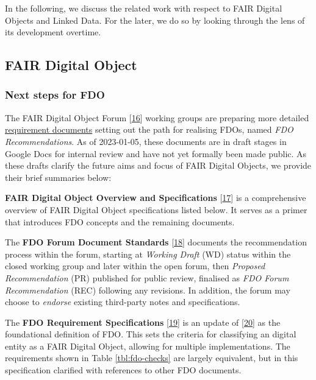 In the following, we discuss the related work with respect to FAIR Digital Objects and Linked Data. For the later, we do so by looking through the lens of its development overtime.

\hypertarget{sec:fdo}{%
\subsection{FAIR Digital Object}\label{sec:fdo}}

\hypertarget{sec:next-step-fdo}{%
\subsubsection{Next steps for FDO}\label{sec:next-step-fdo}}

The FAIR Digital Object Forum {[}\protect\hyperlink{ref-DMEBhHID}{16}{]} working groups are preparing more detailed \href{https://docs.google.com/spreadsheets/d/1O1PTLmVWqjQgvJsIcPgaZJe9BntHZt8_QndEG0eRwUY/edit}{requirement documents} setting out the path for realising FDOs, named \emph{FDO Recommendations}. As of 2023-01-05, these documents are in draft stages in Google Docs for internal review and have not yet formally been made public. As these drafts clarify the future aims and focus of FAIR Digital Objects, we provide their brief summaries below:

\textbf{FAIR Digital Object Overview and Specifications} {[}\protect\hyperlink{ref-11NpETLq1}{17}{]} is a comprehensive overview of FAIR Digital Object specifications listed below. It serves as a primer that introduces FDO concepts and the remaining documents.

The \textbf{FDO Forum Document Standards} {[}\protect\hyperlink{ref-TQdku4YF}{18}{]} documents the recommendation process within the forum, starting at \emph{Working Draft} (WD) status within the closed working group and later within the open forum, then \emph{Proposed Recommendation} (PR) published for public review, finalised as \emph{FDO Forum Recommendation} (REC) following any revisions. In addition, the forum may choose to \emph{endorse} existing third-party notes and specifications.

The \textbf{FDO Requirement Specifications} {[}\protect\hyperlink{ref-yygVPoL0}{19}{]} is an update of {[}\protect\hyperlink{ref-RwvirqWg}{20}{]} as the foundational definition of FDO. This sets the criteria for classifying an digital entity as a FAIR Digital Object, allowing for multiple implementations. The requirements shown in Table \ref{tbl:fdo-checks} are largely equivalent, but in this specification clarified with references to other FDO documents.

